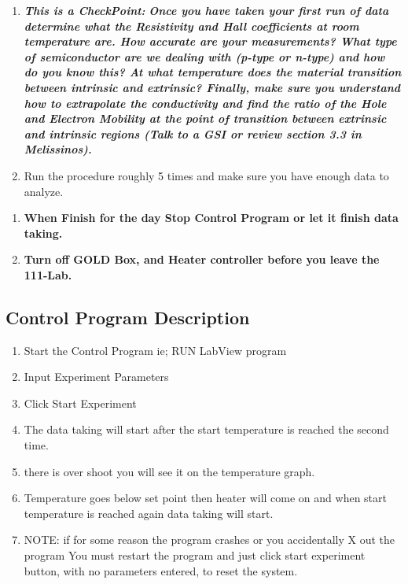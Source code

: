 \documentclass{../lab}
\begin{document}
\begin{enumerate}
    \item \textbf{}\emph{\textbf{This is a CheckPoint:}} \emph{\textbf{Once you have taken your first run of data determine what the Resistivity and Hall coefficients at room temperature are. How accurate are your measurements? What type of semiconductor are we dealing with (p-type or n-type) and how do you know this? At what temperature does the material transition between intrinsic and extrinsic? Finally, make sure you understand how to extrapolate the conductivity and find the ratio of the Hole and Electron Mobility at the point of transition between extrinsic and intrinsic regions (Talk to a GSI or review section 3.3 in Melissinos). }}

    \item Run the procedure roughly 5 times and make sure you have enough data to analyze.

\end{enumerate}

\begin{enumerate}
    \item \textbf{When Finish for the day Stop Control Program or let it finish data taking.}

    \item \textbf{Turn off GOLD Box, and Heater controller before you leave the 111-Lab.}

\end{enumerate}

\subsection{Control Program Description}

\begin{enumerate}
    \item Start the Control Program ie; RUN LabView program

    \item Input Experiment Parameters

    \item Click Start Experiment

    \item The data taking will start after the start temperature is reached the second time.

    \item there is over shoot you will see it on the temperature graph.

    \item Temperature goes below set point then heater will come on and when start temperature is reached again data taking will start.

    \item NOTE: if for some reason the program crashes or you accidentally X out the program You must restart the program and just click start experiment button, with no parameters entered, to reset the system.

\end{enumerate}
\end{document}
